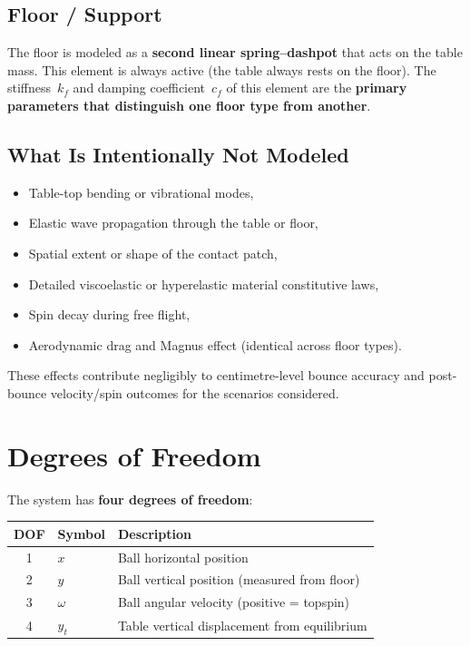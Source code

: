 \documentclass[11pt,a4paper]{article}
\begin{document}
\subsection{Floor / Support}

The floor is modeled as a \textbf{second linear spring--dashpot} that acts on
the table mass. This element is always active (the table always rests on the
floor). The stiffness~$k_f$ and damping coefficient~$c_f$ of this element are
the \textbf{primary parameters that distinguish one floor type from another}.

\subsection{What Is Intentionally Not Modeled}

\begin{itemize}[nosep]
  \item Table-top bending or vibrational modes,
  \item Elastic wave propagation through the table or floor,
  \item Spatial extent or shape of the contact patch,
  \item Detailed viscoelastic or hyperelastic material constitutive laws,
  \item Spin decay during free flight,
  \item Aerodynamic drag and Magnus effect (identical across floor types).
\end{itemize}

These effects contribute negligibly to centimetre-level bounce accuracy and
post-bounce velocity/spin outcomes for the scenarios considered.

\section{Degrees of Freedom}

The system has \textbf{four degrees of freedom}:

\begin{center}
\begin{tabular}{@{}cll@{}}
  \toprule
  DOF & Symbol & Description \\
  \midrule
  1 & $x$     & Ball horizontal position \\
  2 & $y$     & Ball vertical position (measured from floor) \\
  3 & $\omega$ & Ball angular velocity (positive = topspin) \\
  4 & $y_t$   & Table vertical displacement from equilibrium \\
  \bottomrule
\end{tabular}
\end{center}
\end{document}

